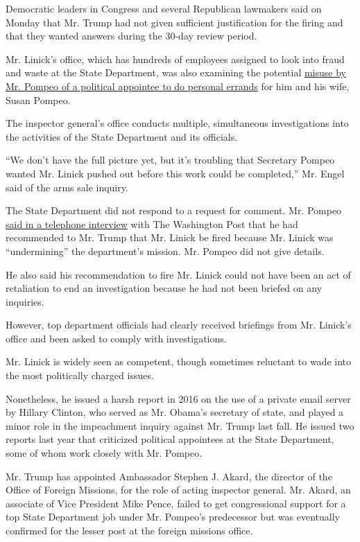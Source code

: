 Democratic leaders in Congress and several Republican lawmakers said on
Monday that Mr. Trump had not given sufficient justification for the
firing and that they wanted answers during the 30-day review period.

Mr. Linick's office, which has hundreds of employees assigned to look
into fraud and waste at the State Department, was also examining the
potential
\href{https://www.nytimes.com/2020/05/17/us/politics/pompeo-inspector-general-steve-linick.html}{misuse
by Mr. Pompeo of a political appointee to do personal errands} for him
and his wife, Susan Pompeo.

The inspector general's office conducts multiple, simultaneous
investigations into the activities of the State Department and its
officials.

``We don't have the full picture yet, but it's troubling that Secretary
Pompeo wanted Mr. Linick pushed out before this work could be
completed,'' Mr. Engel said of the arms sale inquiry.

The State Department did not respond to a request for comment. Mr.
Pompeo
\href{https://www.washingtonpost.com/national-security/pompeo-says-he-didnt-know-fired-inspector-general-was-investigating-him/2020/05/18/3ab08dca-9923-11ea-b60c-3be060a4f8e1_story.html}{said
in a telephone interview} with The Washington Post that he had
recommended to Mr. Trump that Mr. Linick be fired because Mr. Linick was
``undermining'' the department's mission. Mr. Pompeo did not give
details.

He also said his recommendation to fire Mr. Linick could not have been
an act of retaliation to end an investigation because he had not been
briefed on any inquiries.

However, top department officials had clearly received briefings from
Mr. Linick's office and been asked to comply with investigations.

Mr. Linick is widely seen as competent, though sometimes reluctant to
wade into the most politically charged issues.

Nonetheless, he issued a harsh report in 2016 on the use of a private
email server by Hillary Clinton, who served as Mr. Obama's secretary of
state, and played a minor role in the impeachment inquiry against Mr.
Trump last fall. He issued two reports last year that criticized
political appointees at the State Department, some of whom work closely
with Mr. Pompeo.

Mr. Trump has appointed Ambassador Stephen J. Akard, the director of the
Office of Foreign Missions, for the role of acting inspector general.
Mr. Akard, an associate of Vice President Mike Pence, failed to get
congressional support for a top State Department job under Mr. Pompeo's
predecessor but was eventually confirmed for the lesser post at the
foreign missions office.

